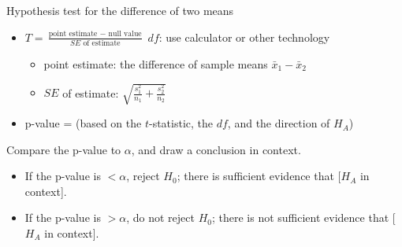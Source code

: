 \begin{onebox}{Hypothesis test for the difference of two means}
\begin{itemize}
\item[] $T = \frac{\text{point estimate } - \text{ null value}}{SE \text{ of estimate}}$ \quad $df$: use calculator or other technology
\begin{itemize}
\item[] point estimate: the difference of sample means $\bar{x}_1 - \bar{x}_2$
\item[] $SE$ of estimate:  $\sqrt{\frac{s^2_1}{n_1}+\frac{s^2_2}{n_2}}$
\end{itemize}
\item[] p-value = (based on the $t$-statistic, the $df$, and the direction of $H_A$)
\end{itemize}
  Compare the p-value to $\alpha$, and draw a conclusion in context.\vspace{-1mm}
\begin{itemize}
\item[] If the p-value is $< \alpha$, reject $H_0$; there is sufficient evidence that [$H_A$ in context]. 
\item[] If the p-value is $> \alpha$, do not reject $H_0$; there is not sufficient evidence that [$H_A$ in context].
\end{itemize}\end{onebox}




\D{\newpage}

